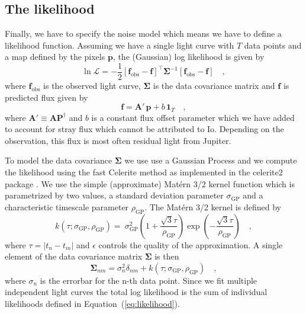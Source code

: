 \documentclass[modern]{aastex62}
\begin{document}
\subsection{The likelihood}
\label{ssec:likelihood}
Finally, we have to specify the noise model which means we have to define a likelihood function.
Assuming we have a single light curve with $T$ data points and a map defined by the pixels $\mathbf{p}$, the (Gaussian) log likelihood is given by
\begin{equation}
    \ln\mathcal{L}=-\frac{1}{2}\left[\mathbf{f}_\mathrm{obs}-\mathbf{f} \right]^{\top}
    \boldsymbol{\Sigma}^{-1}\left[\mathbf{f}_\mathrm{obs}-\mathbf{f} \right]
    \quad,
    \label{eq:likelihood}
\end{equation}
where $\mathbf{f}_\mathrm{obs}$ is the observed light curve, $\boldsymbol{\Sigma}$ is the data covariance matrix and $\mathbf{f}$ is predicted flux given by
\begin{equation}
    \mathbf{f}=\mathbf{A}'\,\mathbf{p} +b\,\mathbf{1}_T
    \quad,
    \label{eq:flux_model}
\end{equation}
where $\mathbf{A}'\equiv\mathbf{A}\mathbf{P}^\dagger$ and $b$ is a constant flux offset parameter which we have added to account for stray flux which cannot be attributed to Io.
Depending on the observation, this flux is most often residual light from Jupiter.

To model the data covariance $\boldsymbol{\Sigma}$ we use use a Gaussian Process and we compute the likelihood using the fast Celerite method \citep{foreman-mackey2017} as implemented in the \textsf{celerite2} package \citep{foreman-mackey2017a,foreman-mackey2018}.
We use the simple (approximate) Mat\'ern 3/2 kernel function which is parametrized by two values, a standard deviation parameter $\sigma_\mathrm{GP}$ and a characteristic timescale parameter $\rho_\mathrm{GP}$.
The Mat\'ern 3/2 kernel is defined by
\begin{equation}
    k(\tau;\sigma_\mathrm{GP},
    \rho_\mathrm{GP})=\
    \sigma_\mathrm{GP}^{2}\left(1+\frac{\sqrt{3} \tau}{\rho_\mathrm{GP}}\right) \exp \left(-\frac{\sqrt{3} \tau}{\rho_\mathrm{GP}}\right)
    \quad,
\end{equation}
where $\tau=|t_n-t_m|$ and $\epsilon$ controls the quality of the approximation.
A single element of the data covariance matrix $\boldsymbol{\Sigma}$ is then 
\begin{equation}
    \boldsymbol{\Sigma}_{nm}=\sigma_n^2\delta_{nm} + k(\tau;\sigma_\mathrm{GP},\rho_\mathrm{GP})
    \quad,
    \label{eq:data_covariance_element}
\end{equation}
where $\sigma_n$ is the errorbar for the n-th data point.
Since we fit multiple independent light curves the total log likelihood is the sum of individual likelihoods defined in Equation~(\ref{eq:likelihood}).
\end{document}
